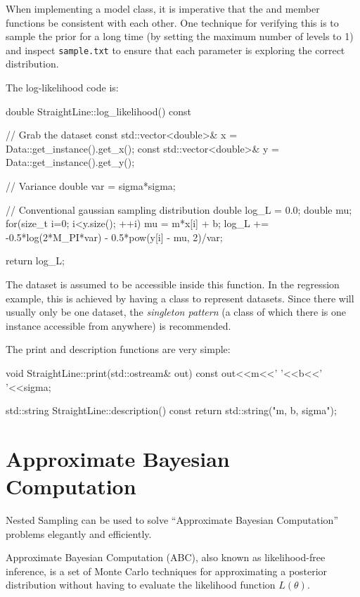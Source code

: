 \documentclass[article]{jss}
\begin{document}
When implementing a model class, it is imperative that the
 and 
member functions be consistent with each other. One technique
for verifying this is to sample the prior for a long time
(by setting the maximum number of levels to 1) and inspect
{\tt sample.txt} to ensure that each parameter is exploring
the correct distribution.

The log-likelihood code is:
\begin{CodeChunk}
\begin{CodeInput}
double StraightLine::log_likelihood() const
{
    // Grab the dataset
    const std::vector<double>& x = Data::get_instance().get_x();
    const std::vector<double>& y = Data::get_instance().get_y();

    // Variance
    double var = sigma*sigma;

    // Conventional gaussian sampling distribution
    double log_L = 0.0;
    double mu;
    for(size_t i=0; i<y.size(); ++i)
    {
        mu = m*x[i] + b;
        log_L += -0.5*log(2*M_PI*var) - 0.5*pow(y[i] - mu, 2)/var;
    }

    return log_L;
}
\end{CodeInput}
\end{CodeChunk}
The dataset is assumed to be accessible inside this function. In the
regression example, this is achieved by having a
 class to represent
datasets. Since there will usually only be one dataset,
the {\em singleton pattern} (a class of which there is one instance
accessible from anywhere) is recommended.

The print and description functions are very simple:
\begin{CodeChunk}
\begin{CodeInput}
void StraightLine::print(std::ostream& out) const
{
    out<<m<<' '<<b<<' '<<sigma;
}

std::string StraightLine::description() const
{
    return std::string("m, b, sigma");
}

\end{CodeInput}
\end{CodeChunk}

\section{Approximate Bayesian Computation}
Nested Sampling can be used to solve ``Approximate Bayesian Computation''
problems elegantly and efficiently.

Approximate Bayesian Computation (ABC), also known as likelihood-free inference,
is a set of Monte Carlo techniques for approximating a posterior distribution
without having to evaluate the likelihood function $L(\theta)$.
\end{document}
